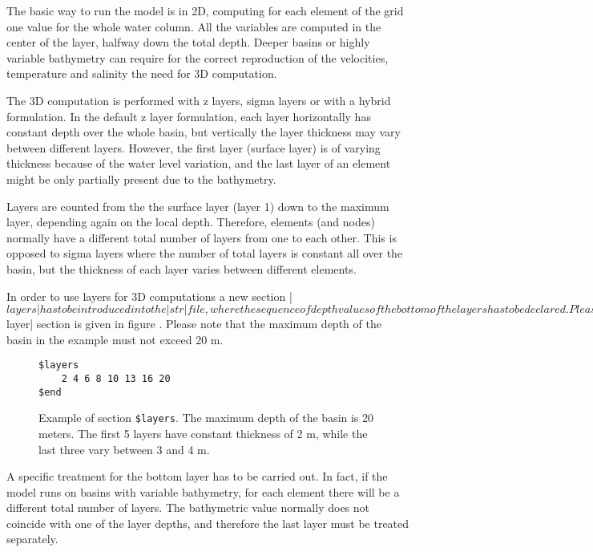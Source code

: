 
The basic way to run the model is in 2D, computing for each element of the
grid one value for the whole water column.  All the variables are computed
in the center of the layer, halfway down the total depth.  Deeper basins
or highly variable bathymetry can require for the correct reproduction
of the velocities, temperature and salinity the need for 3D computation.

The 3D computation is performed with z layers, sigma layers or with
a hybrid formulation.  In the default z layer formulation, each layer
horizontally has constant depth over the whole basin, but vertically
the layer thickness may vary between different layers. However, the
first layer (surface layer) is of varying thickness because of the water
level variation, and the last layer of an element might be only partially
present due to the bathymetry.

Layers are counted from the the surface layer (layer 1) down to the
maximum layer, depending again on the local depth. Therefore, elements
(and nodes) normally have a different total number of layers from one to
each other. This is opposed to sigma layers where the number of total
layers is constant all over the basin, but the thickness of each layer
varies between different elements.

In order to use layers for 3D computations a new section |$layers|
has to be introduced into the |str| file, where the sequence of depth
values of the bottom of the layers has to be declared.  Please, make sure
that in the file |Rules.make|, the number of allowed levels |nlvdim| is
greater or equal than the ones actually used in the |str| file. Layer
depths must be declared in increasing order. An example of a |$layer|
section is given in figure . Please note that the maximum
depth of the basin in the example must not exceed 20 m.

\begin{figure}[ht]
\begin{verbatim}
$layers
	2 4 6 8 10 13 16 20
$end
\end{verbatim}
\caption{Example of section {\tt \$layers}. The maximum depth of 
the basin is 20 meters. The first 5 layers have constant thickness 
of 2 m, while the last three vary between 3 and 4 m.}
\label{fig:layers}
\end{figure}

A specific treatment for the bottom layer has to be carried out.  In fact,
if the model runs on basins with variable bathymetry, for each element
there will be a different total number of layers. The bathymetric value
normally does not coincide with one of the layer depths, and therefore
the last layer must be treated separately.

